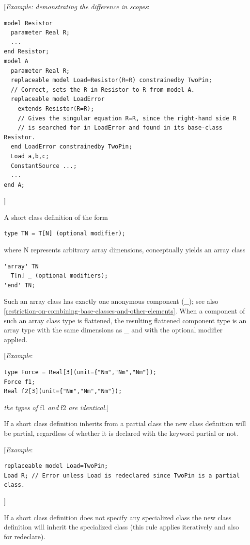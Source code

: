 \documentclass[10pt,a4paper]{report}
\begin{document}
{[}\emph{Example: demonstrating the difference in scopes}:
\begin{lstlisting}[language=modelica]
model Resistor
  parameter Real R;
  ...
end Resistor;
model A
  parameter Real R;
  replaceable model Load=Resistor(R=R) constrainedby TwoPin;
  // Correct, sets the R in Resistor to R from model A.
  replaceable model LoadError
    extends Resistor(R=R);
    // Gives the singular equation R=R, since the right-hand side R
    // is searched for in LoadError and found in its base-class Resistor.
  end LoadError constrainedby TwoPin;
  Load a,b,c;
  ConstantSource ...;
  ...
end A;
\end{lstlisting}
{]}

A short class definition of the form
\begin{lstlisting}[language=modelica]
type TN = T[N] (optional modifier);
\end{lstlisting}

where N represents arbitrary array dimensions, conceptually yields an
array class

\begin{lstlisting}[language=modelica]
'array' TN
  T[n] _ (optional modifiers);
'end' TN;
\end{lstlisting}

Such an array class has exactly one anonymous component (\_); see also
\ref{restriction-on-combining-base-classes-and-other-elements}. 
When a component of such an array class type is
flattened, the resulting flattened component type is an array type with
the same dimensions as \_ and with the optional modifier applied.

{[}\emph{Example}:
\begin{lstlisting}[language=modelica]
type Force = Real[3](unit={"Nm","Nm","Nm"});
Force f1;
Real f2[3](unit={"Nm","Nm","Nm"});
\end{lstlisting}
\emph{the types of} f1 \emph{and} f2 \emph{are identical.}{]}

If a short class definition inherits from a partial class the new class
definition will be partial, regardless of whether it is declared with
the keyword partial or not.

{[}\emph{Example}:
\begin{lstlisting}[language=modelica]
replaceable model Load=TwoPin;
Load R; // Error unless Load is redeclared since TwoPin is a partial class.
\end{lstlisting}

{]}

If a short class definition does not specify any specialized class the
new class definition will inherit the specialized class (this rule
applies iteratively and also for redeclare).
\end{document}

